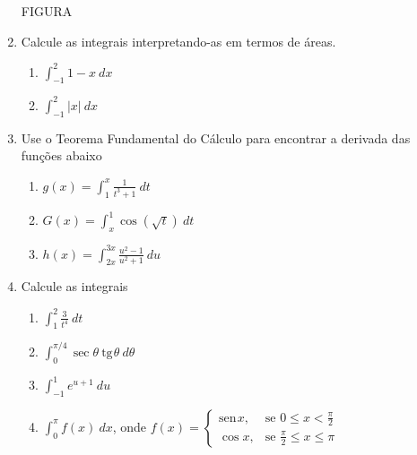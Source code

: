 \documentclass{article}
\providecommand{\sin}{} \renewcommand{\sin}{\mathrm{sen}\hspace{1pt}}
\providecommand{\tan}{} \renewcommand{\tan}{\mathrm{tg}\hspace{1pt}}
\begin{document}
\begin{enumerate}
FIGURA

\item Calcule as integrais interpretando-as em termos de \'areas.

\begin{enumerate}[label=\alph*.]
	\item $\displaystyle\int_{-1}^2 1 - x\ dx$
	\item $\displaystyle\int_{-1}^2 |x|\ dx$
\end{enumerate}
	
\item Use o Teorema Fundamental do C\'alculo para encontrar a derivada das
	fun\c{c}\~oes abaixo

\begin{enumerate}[label=\alph*.]
	\item $\displaystyle g(x) = \int_1^x \frac{1}{t^3 + 1}\ dt$
	\item $\displaystyle G(x) = \int_x^1 \cos(\sqrt{t})\ dt$
	\item $\displaystyle h(x) = \int_{2x}^{3x} \frac{u^2 - 1}{u^2 + 1}\ du$
\end{enumerate}

\item Calcule as integrais

\begin{enumerate}[label=\alph*.]
	\item $\displaystyle\int_1^2 \frac{3}{t^4}\ dt$
	\item $\displaystyle\int_0^{\pi/4} \sec\theta\ \tan\theta\ d\theta$
	\item $\displaystyle\int_{-1}^1 e^{u+1}\ du$
	\item $\displaystyle\int_0^{\pi} f(x)\ dx$, onde $f(x) = \left\{
			\begin{array}{rl}
				\sin x, & \mbox{se } 0 \leqslant x < \frac{\pi}{2} \\
				\cos x, & \mbox{se } \frac{\pi}{2} \leqslant x \leqslant \pi
			\end{array}\right.$
\end{enumerate}

\end{enumerate}
\end{document}
